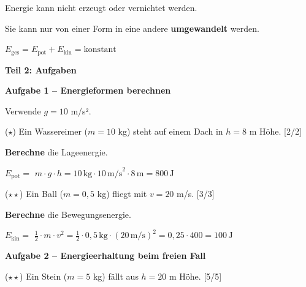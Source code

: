 \documentclass[11pt, a4paper]{article}
\newcommand{\lsg}[1]{\textcolor{loesung}{\textbf{#1}}}
\newcommand{\punktebox}[1]{\hfill\small\textcolor{mittelgrau}{[#1/#1]}}
\newcommand{\aufgabe}[1]{%
    \needspace{4\baselineskip}%
    \vspace{10pt}%
    \noindent\textbf{\textcolor{fachfarbe}{Aufgabe #1}}%
    \vspace{4pt}%
    \nopagebreak[4]%
}
\newcommand{\operator}[1]{\textbf{\textcolor{fachfarbe}{#1}}}
\begin{document}
\begin{merkkasten}[title={\textbf{Kasten 4: Energieerhaltungssatz}}]
Energie kann nicht erzeugt oder vernichtet werden.

Sie kann nur von einer Form in eine andere \lsg{umgewandelt} werden.

\vspace{6pt}
\begin{formelkasten}
\centering
\Large $E_\text{ges} = E_\text{pot} + E_\text{kin} = \text{konstant}$
\end{formelkasten}
\end{merkkasten}

\newpage


\textbf{\large Teil 2: Aufgaben}

\aufgabe{1 – Energieformen berechnen}

Verwende $g = 10$ m/s².

\begin{teil}
\item ($\star$) Ein Wassereimer ($m = 10$ kg) steht auf einem Dach in $h = 8$ m Höhe. \punktebox{2}

\operator{Berechne} die Lageenergie.

\vspace{0.3em}
$E_\text{pot} = $ \lsg{$m \cdot g \cdot h = 10\,\text{kg} \cdot 10\,\text{m/s}^2 \cdot 8\,\text{m} = 800\,\text{J}$}

\vspace{0.8em}

\item ($\star\star$) Ein Ball ($m = 0{,}5$ kg) fliegt mit $v = 20$ m/s. \punktebox{3}

\operator{Berechne} die Bewegungsenergie.

\vspace{0.3em}
$E_\text{kin} = $ \lsg{$\frac{1}{2} \cdot m \cdot v^2 = \frac{1}{2} \cdot 0{,}5\,\text{kg} \cdot (20\,\text{m/s})^2 = 0{,}25 \cdot 400 = 100\,\text{J}$}
\end{teil}

\vspace{1em}

\aufgabe{2 – Energieerhaltung beim freien Fall}

($\star\star$) Ein Stein ($m = 5$ kg) fällt aus $h = 20$ m Höhe. \punktebox{5}
\end{document}
